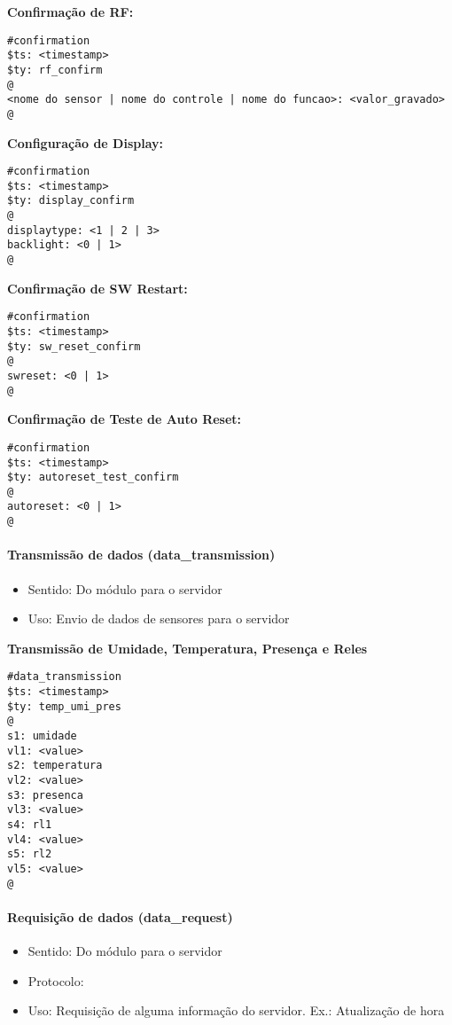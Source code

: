 \textbf{Confirmação de RF:}
\begin{lstlisting}
#confirmation
$ts: <timestamp>
$ty: rf_confirm
@
<nome do sensor | nome do controle | nome do funcao>: <valor_gravado>
@
\end{lstlisting}

\textbf{Configuração de Display:}
\begin{lstlisting}
#confirmation
$ts: <timestamp>
$ty: display_confirm
@
displaytype: <1 | 2 | 3>
backlight: <0 | 1>
@
\end{lstlisting}

\textbf{Confirmação de SW Restart:}
\begin{lstlisting}
#confirmation
$ts: <timestamp>
$ty: sw_reset_confirm
@
swreset: <0 | 1>
@
\end{lstlisting}

\textbf{Confirmação de Teste de Auto Reset:}
\begin{lstlisting}
#confirmation
$ts: <timestamp>
$ty: autoreset_test_confirm
@
autoreset: <0 | 1>
@
\end{lstlisting}

\paragraph{Transmissão de dados (data\_transmission)}
\begin{itemize}
\item Sentido: Do módulo para o servidor
\item Uso: Envio de dados de sensores para o servidor
\end{itemize}

\textbf{Transmissão de Umidade, Temperatura, Presença e Reles}
\begin{lstlisting}
#data_transmission
$ts: <timestamp>
$ty: temp_umi_pres
@
s1: umidade
vl1: <value>
s2: temperatura
vl2: <value>
s3: presenca
vl3: <value>
s4: rl1
vl4: <value>
s5: rl2
vl5: <value>
@
\end{lstlisting}

\paragraph{Requisição de dados (data\_request)}
\begin{itemize}
\item Sentido: Do módulo para o servidor
\item Protocolo: \wmqtt{}
\item Uso: Requisição de alguma informação do servidor. Ex.: Atualização de hora
\end{itemize}


